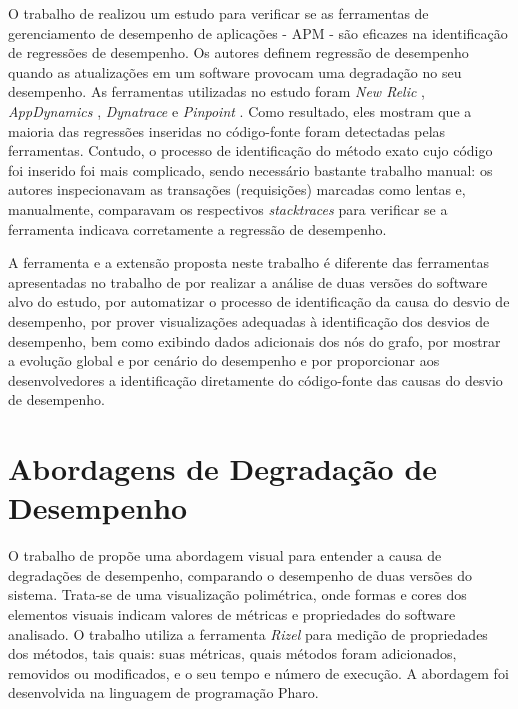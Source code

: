 O trabalho de \citeauthor{Ahmed2016} realizou um estudo para verificar se as ferramentas de gerenciamento de desempenho de aplicações - APM - são eficazes na identificação de regressões de desempenho. Os autores definem regressão de desempenho quando as atualizações em um software provocam uma degradação no seu desempenho. As ferramentas utilizadas no estudo foram \textit{New Relic} \cite{Relic2016}, \textit{AppDynamics} \cite{Appdynamics}, \textit{Dynatrace} \cite{Dynatrace2016} e \textit{Pinpoint} \cite{Pinpoint2016}. Como resultado, eles mostram que a maioria das regressões inseridas no código-fonte foram detectadas pelas ferramentas. Contudo, o processo de identificação do método exato cujo código foi inserido foi mais complicado, sendo necessário bastante trabalho manual: os autores inspecionavam as transações (requisições) marcadas como lentas e, manualmente, comparavam os respectivos \textit{stacktraces} para verificar se a ferramenta indicava corretamente a regressão de desempenho.

A ferramenta e a extensão proposta neste trabalho é diferente das ferramentas apresentadas no trabalho de \citeauthor{Ahmed2016} por realizar a análise de duas versões do software alvo do estudo, por automatizar o processo de identificação da causa do desvio de desempenho, por prover visualizações adequadas à identificação dos desvios de desempenho, bem como exibindo dados adicionais dos nós do grafo, por mostrar a evolução global e por cenário do desempenho e por proporcionar aos desenvolvedores a identificação diretamente do código-fonte das causas do desvio de desempenho.

\section{Abordagens de Degradação de Desempenho} \label{sec:trabalhos-relacionados-adordagens-degradacao-desempenho}

O trabalho de \citeauthor{SandovalAlcocer2013} propõe uma abordagem visual para entender a causa de degradações de desempenho, comparando o desempenho de duas versões do sistema. Trata-se de uma visualização polimétrica, onde formas e cores dos elementos visuais indicam valores de métricas e propriedades do software analisado. O trabalho utiliza a ferramenta \textit{Rizel} para medição de propriedades dos métodos, tais quais: suas métricas, quais métodos foram adicionados, removidos ou modificados, e o seu tempo e número de execução. A abordagem foi desenvolvida na linguagem de programação Pharo.

